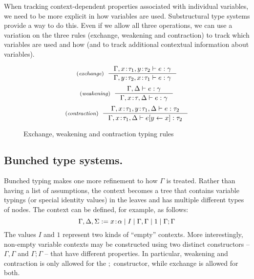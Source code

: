 When tracking context-dependent properties associated with individual variables, we need to 
be more explicit in how variables are used. Substructural type systems provide a way to do this.
Even if we allow all three operations, we can use a variation on the three rules (exchange, 
weakening and contraction) to track which variables are used and how (and to track additional 
contextual information about variables). 

\begin{figure}
\begin{equation*}
\tyrule{exchange}
  {\Gamma, x\!:\!\tau_1, y\!:\!\tau_2 \vdash e : \gamma}
  {\Gamma, y\!:\!\tau_2, x\!:\!\tau_1 \vdash e : \gamma}
\end{equation*}
\begin{equation*}
\tyrule{weakening}
  {\Gamma, \Delta \vdash e : \gamma}
  {\Gamma, x\!:\!\tau, \Delta \vdash e : \gamma}
\end{equation*}
\begin{equation*}
\tyrule{contraction}
  {\Gamma, x\!:\!\tau_1, y\!:\!\tau_1, \Delta \vdash e : \tau_2}
  {\Gamma, x\!:\!\tau_1, \Delta \vdash \subst{e}{y}{x} : \tau_2}
\end{equation*}

\caption{Exchange, weakening and contraction typing rules}
\label{fig:substructural-rules}
\end{figure}


\subsection{Bunched type systems.}
Bunched typing makes one more refinement to how $\Gamma$ is treated. Rather than having a list
of assumptions, the context becomes a tree that contains variable typings (or special identity
values) in the leaves and has multiple different types of nodes. The context can be defined,
for example, as follows:
%
\begin{equation*}
\Gamma, \Delta, \Sigma := x\!:\!\alpha \; | \; I \; | \; \Gamma, \Gamma \; | \; 1 \; | \; \Gamma; \Gamma
\end{equation*}
%
The values $I$ and $1$ represent two kinds of ``empty'' contexts. More interestingly, non-empty
variable contexts may be constructed using two distinct constructors -- $\Gamma, \Gamma$ and 
$\Gamma; \Gamma$ -- that have different properties. In particular, weakening and contraction is
only allowed for the $;$ constructor, while exchange is allowed for both.  

